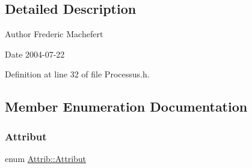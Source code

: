 \subsection{Detailed Description}
\begin{DoxyAuthor}{Author}
Frederic Machefert 
\end{DoxyAuthor}
\begin{DoxyDate}{Date}
2004-\/07-\/22 
\end{DoxyDate}


Definition at line 32 of file Processus.\+h.



\subsection{Member Enumeration Documentation}
\mbox{\label{classAttrib_a69e171d7cc6417835a5a306d3c764235}} 
\subsubsection{\texorpdfstring{Attribut}{Attribut}}
{\footnotesize\ttfamily enum \hyperlink{classAttrib_a69e171d7cc6417835a5a306d3c764235}{Attrib\+::\+Attribut}\hspace{0.3cm}{\ttfamily [inherited]}}

